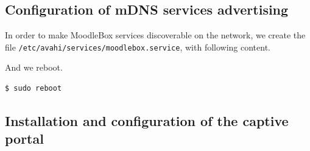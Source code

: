 \documentclass[12pt]{article}
\begin{document}
\subsection{Configuration of mDNS services advertising}

In order to make MoodleBox services discoverable on the network, we create the file \lstinline{/etc/avahi/services/moodlebox.service}, with following content.

And we reboot.
\begin{lstlisting}[language=bash]
$ sudo reboot
\end{lstlisting}

\subsection{Installation and configuration of the captive portal}
\end{document}
